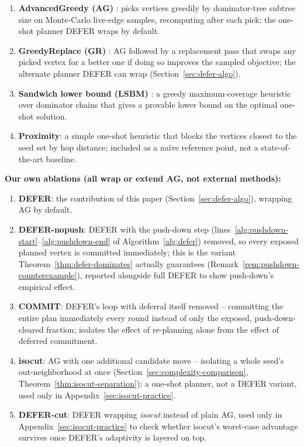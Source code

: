 \documentclass[11pt]{article}
\theoremstyle{definition}
\theoremstyle{remark}
\begin{document}
\begin{enumerate}
\item \textbf{AdvancedGreedy (AG)} \citep{xie2023,xie2024}: picks vertices
  greedily by dominator-tree subtree size on Monte-Carlo live-edge
  samples, recomputing after each pick; the one-shot planner DEFER wraps
  by default.
\item \textbf{GreedyReplace (GR)} \citep{xie2023,xie2024}: AG followed by a
  replacement pass that swaps any picked vertex for a better one if doing
  so improves the sampled objective; the alternate planner DEFER can wrap
  (Section~\ref{sec:defer-algo}).
\item \textbf{Sandwich lower bound (LSBM)} \citep{wang2024sandwich}: a
  greedy maximum-coverage heuristic over dominator chains that gives a
  provable lower bound on the optimal one-shot solution.
\item \textbf{Proximity}: a simple one-shot heuristic that blocks the
  vertices closest to the seed set by hop distance; included as a
  na\"ive reference point, not a state-of-the-art baseline.
\end{enumerate}

\noindent\textbf{Our own ablations (all wrap or extend AG, not external
methods):}

\begin{enumerate}
\item \textbf{DEFER}: the contribution of this paper (Section~\ref{sec:defer-algo}),
  wrapping AG by default.
\item \textbf{DEFER-nopush}: DEFER with the push-down step
  (lines~\ref{alg:pushdown-start}--\ref{alg:pushdown-end} of
  Algorithm~\ref{alg:defer}) removed, so every exposed planned vertex is
  committed immediately; this is the variant Theorem~\ref{thm:defer-dominates}
  actually guarantees (Remark~\ref{rem:pushdown-counterexample}), reported
  alongside full DEFER to show push-down's empirical effect.
\item \textbf{COMMIT}: DEFER's loop with deferral itself removed --
  committing the entire plan immediately every round instead of only the
  exposed, push-down-cleared fraction; isolates the effect of re-planning
  alone from the effect of deferred commitment.
\item \textbf{isocut}: AG with one additional candidate move -- isolating
  a whole seed's out-neighborhood at once
  (Section~\ref{sec:complexity-comparison}, Theorem~\ref{thm:isocut-separation});
  a one-shot planner, not a DEFER variant, used only in
  Appendix~\ref{sec:isocut-practice}.
\item \textbf{DEFER-cut}: DEFER wrapping \emph{isocut} instead of plain
  AG, used only in Appendix~\ref{sec:isocut-practice} to check
  whether isocut's worst-case advantage survives once DEFER's adaptivity
  is layered on top.
\end{enumerate}
\end{document}
